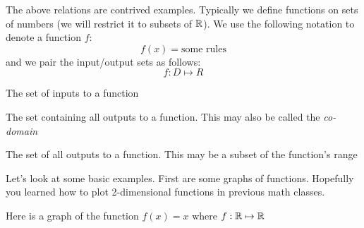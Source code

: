 \documentclass[main.tex]{subfiles}
\begin{document}
The above relations are contrived examples. Typically we define functions on sets of numbers (we will restrict it to subsets of \(\mathbb{R}\)). We use the following notation to denote a function \(f\): \[f(x) = \text{some rules}\] and we pair the input/output sets as follows: \[f : D \mapsto R\]

\begin{defn}
	The set of inputs to a function
\end{defn}

\begin{defn}
	The set containing all outputs to a function. This may also be called the \textit{co-domain}
\end{defn}

\begin{defn}
	The set of all outputs to a function. This may be a subset of the function's range
\end{defn}

Let's look at some basic examples. First are some graphs of functions. Hopefully you learned how to plot 2-dimensional functions in previous math classes.

\begin{example}
	Here is a graph of the function \(f(x) = x\) where \(f : \mathbb{R} \mapsto \mathbb{R}\)
	
	\begin{center}
	\end{center}
\end{example}
\end{document}
